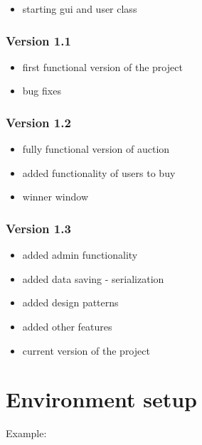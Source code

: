 \documentclass[
]{report}
\providecommand{\tightlist}{%
  \setlength{\itemsep}{0pt}\setlength{\parskip}{0pt}}
\begin{document}
\begin{itemize}
\tightlist
\item
  starting gui and user class
\end{itemize}

\hypertarget{version-1.1}{%
\subsection{Version 1.1}\label{version-1.1}}

\begin{itemize}
\tightlist
\item
  first functional version of the project
\item
  bug fixes
\end{itemize}

\hypertarget{version-1.2}{%
\subsection{Version 1.2}\label{version-1.2}}

\begin{itemize}
\tightlist
\item
  fully functional version of auction
\item
  added functionality of users to buy
\item
  winner window
\end{itemize}

\hypertarget{version-1.3}{%
\subsection{Version 1.3}\label{version-1.3}}

\begin{itemize}
\tightlist
\item
  added admin functionality
\item
  added data saving - serialization
\item
  added design patterns
\item
  added other features
\item
  current version of the project
\end{itemize}

\hypertarget{environment-setup}{%
\chapter{Environment setup}\label{environment-setup}}

Example:
\end{document}
